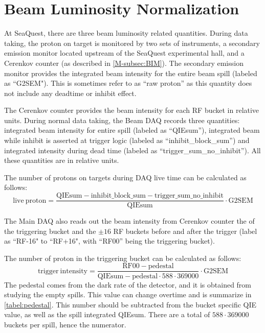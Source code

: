 \documentclass[../main.tex]{subfiles}
\begin{document}
\section{Beam Luminosity Normalization}
\label{sec:beam_norm}
At SeaQuest, there are three beam luminosity related quantities.
During data taking, the proton on target is monitored by two sets of instruments, a secondary
emission monitor located upstream of the SeaQuest experimental hall, and a Cerenkov counter
(as described in \cref{M-subsec:BIM}). The secondary emission monitor provides the integrated
beam intensity for the entire beam spill (labeled as ``G2SEM"). This is sometimes refer to as
``raw proton'' as this quantity does not include any deadtime or inhibit effect.

The Cerenkov counter provides the beam intensity for each RF bucket in relative units.
During normal data taking, the Beam DAQ records three quantities: integrated beam intensity for entire spill
(labeled as ``QIEsum''), integrated beam while inhibit is asserted at trigger logic
(labeled as ``inhibit\_block\_sum'') and integrated intensity during dead time (labeled as
``trigger\_sum\_no\_inhibit''). All these quantities are in relative units.

The number of protons on targets during DAQ live time can be calculated as follows:
\begin{equation}
	\mathrm{live\ proton} = \frac{\mathrm{QIEsum}-\mathrm{inhibit\_block\_sum}-\mathrm{trigger\_sum\_no\_inhibit}}{\mathrm{QIEsum}}\cdot \mathrm{G2SEM}
\end{equation}

The Main DAQ also reads out the beam intensity from Cerenkov counter the of the triggering bucket
and the $\pm16$ RF buckets before and after the trigger (label as ``RF-16" to ``RF+16", with
``RF00'' being the triggering bucket).

The number of proton in the triggering bucket can be calculated as follows:
\begin{equation}
	\mathrm{trigger\ intensity} = \frac{\mathrm{RF00}-\mathrm{pedestal}}{\mathrm{QIEsum}-\mathrm{pedestal}\cdot 588\cdot 369000}\cdot \mathrm{G2SEM}
\end{equation}
The pedestal comes from the dark rate of the detector, and it is obtained from studying the
empty spills. This value can change overtime and is summarize in \cref{tabel:pedestal}.
This number should be subtracted from the bucket specific QIE value, as well as the spill
integrated QIEsum. There are a total of $588\cdot 369000$ buckets per spill, hence the
numerator.
\end{document}
